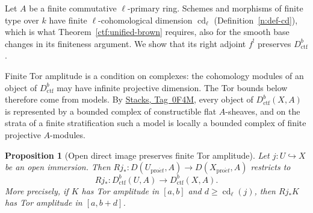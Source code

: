 \documentclass[11pt,a4paper]{article}
\numberwithin{equation}{section}
\newtheorem{proposition}[theorem]{Proposition}
\theoremstyle{definition}
\theoremstyle{remark}
\newcommand{\proet}{\mathrm{pro}\acute{e}t}
\newcommand{\stacks}[1]{\href{https://stacks.math.columbia.edu/tag/#1}{\textnormal{Stacks, Tag~#1}}}
\newcommand{\Dctf}{D^b_{\mathrm{ctf}}}
\begin{document}
Let $A$ be a finite commutative $\ell$-primary ring. Schemes and
morphisms of finite type over $k$ have finite $\ell$-cohomological
dimension $\operatorname{cd}_\ell$ (Definition~\ref{n:def-cd}), which is
what Theorem~\ref{ctf:unified-brown} requires, also for the smooth base
changes in its finiteness argument. We show that its right adjoint
$f^!$ preserves $\Dctf$.

Finite Tor amplitude is a condition on complexes: the cohomology
modules of an object of $\Dctf$ may have infinite projective dimension. The
Tor bounds below therefore come from models. By \stacks{0F4M}, every
object of $\Dctf(X,A)$ is represented by a bounded complex of
constructible flat $A$-sheaves, and on the strata of a finite
stratification such a model is locally a bounded complex of finite
projective $A$-modules.

\begin{proposition}[Open direct image preserves finite Tor amplitude]
\label{ctf:finite-open}
Let $j:U\hookrightarrow X$ be an open immersion. Then
$Rj_*\colon D(U_{\proet},A)\to D(X_{\proet},A)$ restricts to
\[
 Rj_*:\Dctf(U,A)\longrightarrow\Dctf(X,A).
\]
More precisely, if $K$ has Tor amplitude in $[a,b]$ and $d\ge
\operatorname{cd}_\ell(j)$, then $Rj_*K$ has Tor amplitude in $[a,b+d]$.
\end{proposition}
\end{document}
